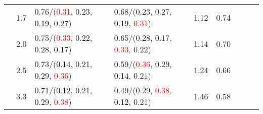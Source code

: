 \documentclass[10pt,a4paper]{report}
\begin{document}
\begin{table}[!htbp]
\begin{center}
{\begin{tabular}{ccllccccc}
				  & 1.7                               & 0.76/(\textcolor{red}{0.31}, 0.23, \textcolor{black}{0.19}, 0.27)                                 & 0.68/(0.23, 0.27, \textcolor{black}{0.19}, \textcolor{red}{0.31})                                 & 1.12             & 0.74                     \\
				  & 2.0                               & 0.75/(\textcolor{red}{0.33}, 0.22, 0.28, \textcolor{black}{0.17})                                 & 0.65/(0.28, \textcolor{black}{0.17}, \textcolor{red}{0.33}, 0.22)                                 & 1.14             & 0.70                     \\
				  & 2.5                               & 0.73/(\textcolor{black}{0.14}, 0.21, 0.29, \textcolor{red}{0.36})                                 & 0.59/(\textcolor{red}{0.36}, 0.29, \textcolor{black}{0.14}, 0.21)                                 & 1.24             & 0.66                     \\
				  & 3.3                               & 0.71/(\textcolor{black}{0.12}, 0.21, 0.29, \textcolor{red}{0.38})                                 & 0.49/(0.29, \textcolor{red}{0.38}, \textcolor{black}{0.12}, 0.21)                                 & 1.46             & 0.58                     \\
				\bottomrule
			\end{tabular}}
	\end{center}
\end{table}
\end{document}
